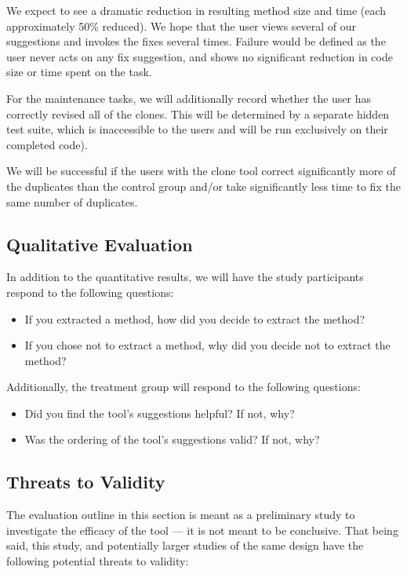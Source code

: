 \documentclass[nocopyrightspace,10pt]{sigplanconf}
\begin{document}
We expect to see a dramatic reduction in resulting method size and
time (each approximately 50\% reduced).  We hope that the user views
several of our suggestions and invokes the fixes several times.
Failure would be defined as the user never acts on any fix suggestion,
and shows no significant reduction in code size or time spent on the
task.

For the maintenance tasks, we will additionally record whether the
user has correctly revised all of the clones. This will be determined
by a separate hidden test suite, which is inaccessible to the users
and will be run exclusively on their completed code).

We will be successful if the users with the clone tool correct
significantly more of the duplicates than the control group and/or
take significantly less time to fix the same number of duplicates.

\subsection{Qualitative Evaluation}
In addition to the quantitative results, we will have the study
participants respond to the following questions:

\begin{itemize}
  \item If you extracted a method, how did you decide to extract the
    method? 
  \item If you chose not to extract a method, why did you decide not
    to extract the method?
\end{itemize}

\noindent Additionally, the treatment group will respond to the following
questions:

\begin{itemize}
  \item Did you find the tool's suggestions helpful? If not, why?
  \item Was the ordering of the tool's suggestions valid? If not, why?
\end{itemize}

\subsection{Threats to Validity}
The evaluation outline in this section is meant as a preliminary study
to investigate the efficacy of the tool --- it is not meant to be
conclusive. That being said, this study, and potentially larger
studies of the same design have the following potential threats to
validity:
\end{document}
